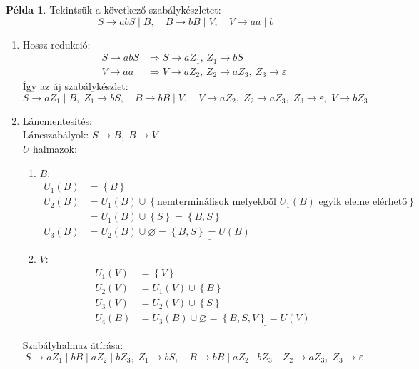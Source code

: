 \documentclass[a4paper,12pt]{article}
\theoremstyle{definition}
\newtheorem*{example}{Példa}
\begin{document}
\begin{example}
	Tekintsük a következő szabálykészletet:
	\[
	S \rightarrow abS \mid B, \quad B \rightarrow bB \mid V, \quad V \rightarrow aa \mid b
	\]
	\begin{enumerate}
		\item Hossz redukció:
		\begin{align*}
			S \rightarrow abS &\Rightarrow S \rightarrow aZ_1, \, Z_1 \rightarrow bS \\
			V \rightarrow aa &\Rightarrow V \rightarrow aZ_2, \, Z_2 \rightarrow aZ_3, \ Z_3 \rightarrow \varepsilon 
		\end{align*}
		Így az új szabálykészlet:
		\[
		S \rightarrow aZ_1 \mid B, \;
		Z_1 \rightarrow bS, \quad
		B \rightarrow bB \mid V, \quad
		V \rightarrow aZ_2, \;
		Z_2 \rightarrow aZ_3, \;
		Z_3 \rightarrow \varepsilon, \;
		V \rightarrow bZ_3
		\]
		\item Láncmentesítés: \\
		Láncszabályok: $ S \rightarrow B, \; B \rightarrow V $ \\
		$U$ halmazok:
		\begin{enumerate}
			\item $B$:
			\begin{align*}
				U_1(B) &= \left\lbrace B \right\rbrace \\
				U_2(B) &= U_1(B) \cup \left\lbrace \text{nemterminálisok melyekből } U_1(B) \text{ egyik eleme elérhető} \right\rbrace \\
				&= U_1(B) \cup \left\lbrace S \right\rbrace = \left\lbrace B, S \right\rbrace \\
				U_3(B) &= U_2(B) \cup \varnothing = \underline{\left\lbrace B, S \right\rbrace = U(B)}
			\end{align*}
			\item $V$:
			\begin{align*}
				U_1(V) &= \left\lbrace V \right\rbrace \\
				U_2(V) &= U_1(V) \cup \left\lbrace B \right\rbrace \\
				U_3(V) &= U_2(V) \cup \left\lbrace S \right\rbrace \\
				U_4(B) &= U_3(B) \cup \varnothing = \underline{\left\lbrace B, S, V \right\rbrace = U(V)}
			\end{align*}
			
		\end{enumerate}
		Szabályhalmaz átírása:
		\[
		S \rightarrow aZ_1 \mid bB \mid aZ_2 \mid bZ_3,  \;
		Z_1 \rightarrow bS, \quad
		B \rightarrow bB \mid aZ_2 \mid bZ_3 \quad
		Z_2 \rightarrow aZ_3, \;
		Z_3 \rightarrow \varepsilon
		\]
	\end{enumerate}
\end{example}
\end{document}
